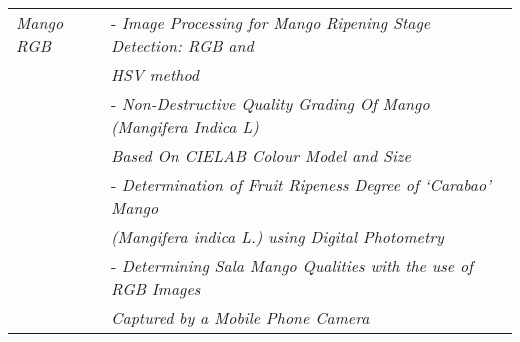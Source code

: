 \begin{anexosenv}
\begin{center}
\begin{longtable}{ll}
\textit{Mango RGB}							& - \textit{Image Processing for Mango Ripening Stage Detection: RGB and} \\
											&	\textit{HSV method} \\ 
											& - \textit{Non-Destructive Quality Grading Of Mango (Mangifera Indica L)} \\
											&	\textit{Based On CIELAB Colour Model and Size}  \\
											& - \textit{Determination of Fruit Ripeness Degree of ‘Carabao’ Mango} \\
											&	\textit{(Mangifera indica L.) using Digital Photometry} 	\\
											& - \textit{Determining Sala Mango Qualities with the use of RGB Images} \\
											&	\textit{Captured by a Mobile Phone Camera} \\ \hline

\end{longtable}
\end{center}


\end{anexosenv}
